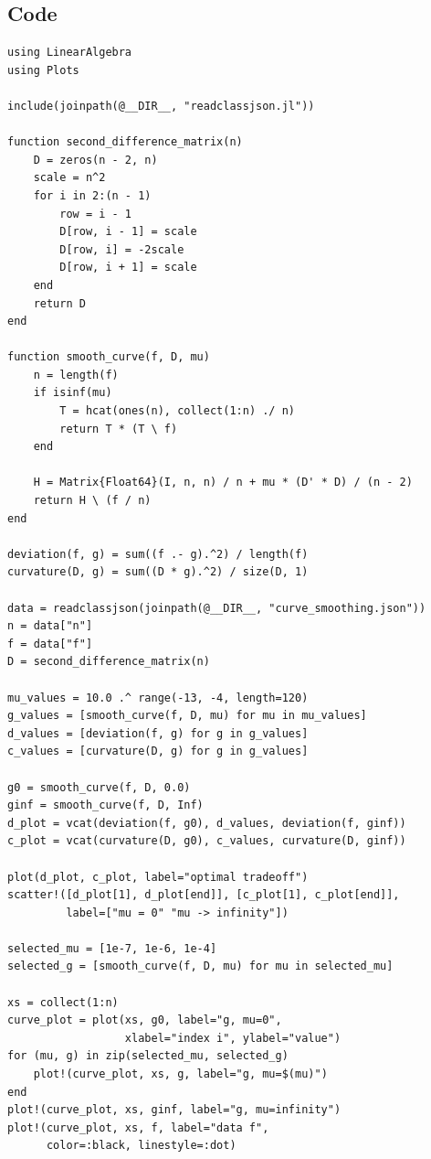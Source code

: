\subsection{Code}
\begin{lstlisting}[language={}]
using LinearAlgebra
using Plots

include(joinpath(@__DIR__, "readclassjson.jl"))

function second_difference_matrix(n)
    D = zeros(n - 2, n)
    scale = n^2
    for i in 2:(n - 1)
        row = i - 1
        D[row, i - 1] = scale
        D[row, i] = -2scale
        D[row, i + 1] = scale
    end
    return D
end

function smooth_curve(f, D, mu)
    n = length(f)
    if isinf(mu)
        T = hcat(ones(n), collect(1:n) ./ n)
        return T * (T \ f)
    end

    H = Matrix{Float64}(I, n, n) / n + mu * (D' * D) / (n - 2)
    return H \ (f / n)
end

deviation(f, g) = sum((f .- g).^2) / length(f)
curvature(D, g) = sum((D * g).^2) / size(D, 1)

data = readclassjson(joinpath(@__DIR__, "curve_smoothing.json"))
n = data["n"]
f = data["f"]
D = second_difference_matrix(n)

mu_values = 10.0 .^ range(-13, -4, length=120)
g_values = [smooth_curve(f, D, mu) for mu in mu_values]
d_values = [deviation(f, g) for g in g_values]
c_values = [curvature(D, g) for g in g_values]

g0 = smooth_curve(f, D, 0.0)
ginf = smooth_curve(f, D, Inf)
d_plot = vcat(deviation(f, g0), d_values, deviation(f, ginf))
c_plot = vcat(curvature(D, g0), c_values, curvature(D, ginf))

plot(d_plot, c_plot, label="optimal tradeoff")
scatter!([d_plot[1], d_plot[end]], [c_plot[1], c_plot[end]],
         label=["mu = 0" "mu -> infinity"])

selected_mu = [1e-7, 1e-6, 1e-4]
selected_g = [smooth_curve(f, D, mu) for mu in selected_mu]

xs = collect(1:n)
curve_plot = plot(xs, g0, label="g, mu=0",
                  xlabel="index i", ylabel="value")
for (mu, g) in zip(selected_mu, selected_g)
    plot!(curve_plot, xs, g, label="g, mu=$(mu)")
end
plot!(curve_plot, xs, ginf, label="g, mu=infinity")
plot!(curve_plot, xs, f, label="data f",
      color=:black, linestyle=:dot)
\end{lstlisting}

